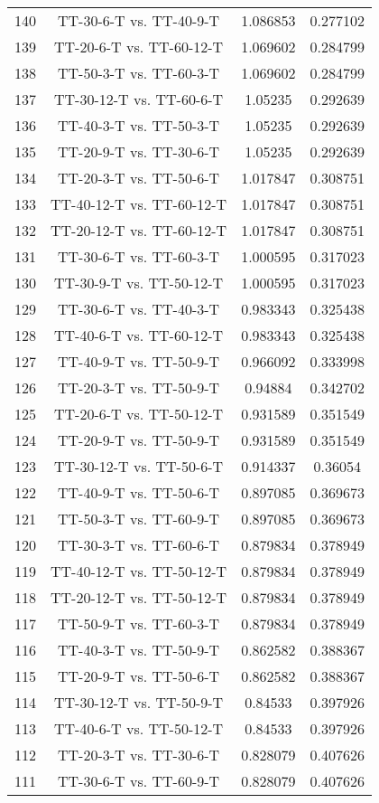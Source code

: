 \documentclass[a4paper,10pt]{article}
\begin{document}
\begin{landscape}
\begin{table}[!htp]
\begin{tabular}{cccc}
140&TT-30-6-T vs. TT-40-9-T&1.086853&0.277102\\
139&TT-20-6-T vs. TT-60-12-T&1.069602&0.284799\\
138&TT-50-3-T vs. TT-60-3-T&1.069602&0.284799\\
137&TT-30-12-T vs. TT-60-6-T&1.05235&0.292639\\
136&TT-40-3-T vs. TT-50-3-T&1.05235&0.292639\\
135&TT-20-9-T vs. TT-30-6-T&1.05235&0.292639\\
134&TT-20-3-T vs. TT-50-6-T&1.017847&0.308751\\
133&TT-40-12-T vs. TT-60-12-T&1.017847&0.308751\\
132&TT-20-12-T vs. TT-60-12-T&1.017847&0.308751\\
131&TT-30-6-T vs. TT-60-3-T&1.000595&0.317023\\
130&TT-30-9-T vs. TT-50-12-T&1.000595&0.317023\\
129&TT-30-6-T vs. TT-40-3-T&0.983343&0.325438\\
128&TT-40-6-T vs. TT-60-12-T&0.983343&0.325438\\
127&TT-40-9-T vs. TT-50-9-T&0.966092&0.333998\\
126&TT-20-3-T vs. TT-50-9-T&0.94884&0.342702\\
125&TT-20-6-T vs. TT-50-12-T&0.931589&0.351549\\
124&TT-20-9-T vs. TT-50-9-T&0.931589&0.351549\\
123&TT-30-12-T vs. TT-50-6-T&0.914337&0.36054\\
122&TT-40-9-T vs. TT-50-6-T&0.897085&0.369673\\
121&TT-50-3-T vs. TT-60-9-T&0.897085&0.369673\\
120&TT-30-3-T vs. TT-60-6-T&0.879834&0.378949\\
119&TT-40-12-T vs. TT-50-12-T&0.879834&0.378949\\
118&TT-20-12-T vs. TT-50-12-T&0.879834&0.378949\\
117&TT-50-9-T vs. TT-60-3-T&0.879834&0.378949\\
116&TT-40-3-T vs. TT-50-9-T&0.862582&0.388367\\
115&TT-20-9-T vs. TT-50-6-T&0.862582&0.388367\\
114&TT-30-12-T vs. TT-50-9-T&0.84533&0.397926\\
113&TT-40-6-T vs. TT-50-12-T&0.84533&0.397926\\
112&TT-20-3-T vs. TT-30-6-T&0.828079&0.407626\\
111&TT-30-6-T vs. TT-60-9-T&0.828079&0.407626\\

\end{tabular}
\end{table}
\end{landscape}
\end{document}
